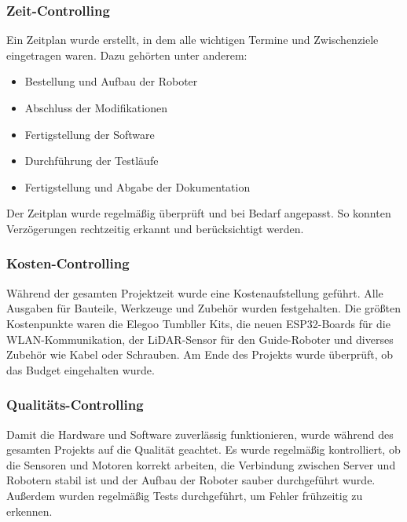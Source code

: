 \subsubsection{Zeit-Controlling}
Ein Zeitplan wurde erstellt, in dem alle wichtigen Termine und Zwischenziele eingetragen waren.
Dazu gehörten unter anderem:
\begin{itemize}
    \item Bestellung und Aufbau der Roboter
    \item Abschluss der Modifikationen
    \item Fertigstellung der Software
    \item Durchführung der Testläufe
    \item Fertigstellung und Abgabe der Dokumentation
\end{itemize}
Der Zeitplan wurde regelmäßig überprüft und bei Bedarf angepasst. So konnten Verzögerungen rechtzeitig erkannt und berücksichtigt werden.
\subsubsection{Kosten-Controlling}
Während der gesamten Projektzeit wurde eine Kostenaufstellung geführt. Alle Ausgaben für Bauteile, Werkzeuge und Zubehör wurden festgehalten.
Die größten Kostenpunkte waren die Elegoo Tumbller Kits, die neuen ESP32-Boards für die WLAN-Kommunikation, der LiDAR-Sensor für den Guide-Roboter und diverses Zubehör wie Kabel oder Schrauben.
Am Ende des Projekts wurde überprüft, ob das Budget eingehalten wurde.
\subsubsection{Qualitäts-Controlling}
Damit die Hardware und Software zuverlässig funktionieren, wurde während des gesamten Projekts auf die Qualität geachtet.
Es wurde regelmäßig kontrolliert, ob die Sensoren und Motoren korrekt arbeiten, die Verbindung zwischen Server und Robotern stabil ist und der Aufbau der Roboter sauber durchgeführt wurde.
Außerdem wurden regelmäßig Tests durchgeführt, um Fehler frühzeitig zu erkennen.
%
